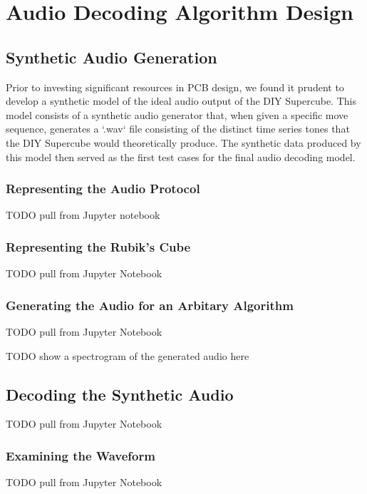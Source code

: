 
\chapter{Audio Decoding Algorithm Design} %

\label{Chapter5} %


\section{Synthetic Audio Generation}

Prior to investing significant resources in PCB design, we found it prudent to develop a synthetic model of the ideal audio output of the DIY Supercube. This model consists of a synthetic audio generator that, when given a specific move sequence, generates a `.wav` file consisting of the distinct time series tones that the DIY Supercube would theoretically produce. The synthetic data produced by this model then served as the first test cases for the final audio decoding model.

\subsection{Representing the Audio Protocol}
TODO pull from Jupyter notebook

\subsection{Representing the Rubik's Cube}
TODO pull from Jupyter Notebook

\subsection{Generating the Audio for an Arbitary Algorithm}
TODO pull from Jupyter Notebook

TODO show a spectrogram of the generated audio here


\section{Decoding the Synthetic Audio}

TODO pull from Jupyter Notebook

\subsection{Examining the Waveform}
TODO pull from Jupyter Notebook

